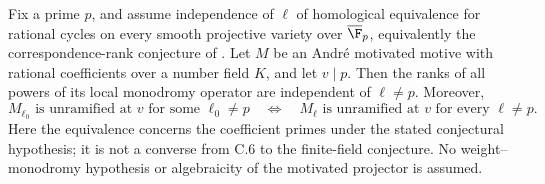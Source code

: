 \begin{theorem}
\label{c:motivated-unramified-rank-reduction}
Fix a prime $p$, and assume independence of $\ell$ of homological
equivalence for rational cycles on every smooth projective variety
over $\overline{\F}_p$, equivalently the correspondence-rank
conjecture of
\citet[Theorems~4.6 and~5.1 and Corollary~5.2]{c_vandobben2020}.
Let $M$ be an Andr\'e motivated motive with rational coefficients
over a number field $K$, and let $v\mid p$.
Then the ranks of all powers of its local monodromy operator are
independent of $\ell\ne p$. Moreover,
\[
 M_{\ell_0}\text{ is unramified at }v\text{ for some }\ell_0\ne p
 \quad\Longleftrightarrow\quad
 M_\ell\text{ is unramified at }v\text{ for every }\ell\ne p.
\]
Here the equivalence concerns the coefficient primes under the
stated conjectural hypothesis; it is not a converse from C.6 to
the finite-field conjecture. No weight--monodromy hypothesis or
algebraicity of the motivated projector is assumed.
\end{theorem}

